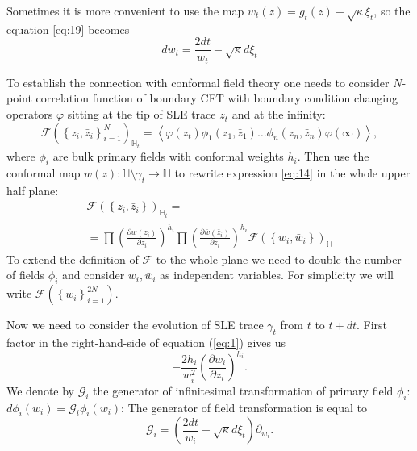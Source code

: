 \documentclass[12pt]{article}
\begin{document}
Sometimes it is more convenient to use the map $w_{t} (z)=g_{t}(z)-\sqrt{\kappa}\xi_{t}$, so the equation \eqref{eq:19} becomes
\begin{equation}
  \label{eq:20}
       d w _{t}= \frac{2dt}{w_{t} }-\sqrt{\kappa}d\xi_{t}  
\end{equation}

To establish the connection with conformal field theory one needs to
consider $N$-point correlation function of boundary CFT with boundary
condition changing operators $\varphi$ sitting at the tip of SLE trace
$z_t$ and at the infinity:
\begin{equation}
  \mathcal{F}(\left\{z_{i},\bar z_{i}\right\}_{i=1}^{N})_{\mathbb{H}_{t}}=
\left<\varphi(z_{t}) \phi_{1}(z_{1},\bar z_{1}) \dots \phi_{n}(z_{n},\bar z_{n})
      \varphi(\infty)\right>,
    \label{eq:14}
\end{equation}
where $\phi_{i}$ are bulk primary fields with conformal weights $h_i$.
Then use the conformal map  $w(z):\mathbb{H}\setminus\gamma_{t}\to \mathbb{H}$ to rewrite expression \eqref{eq:14} in the whole upper half plane:
\begin{multline}
  \mathcal{F}(\left\{z_{i},\bar z_{i}\right\})_{\mathbb{H}_{t}}=\\
  =\prod \left(\frac{\partial w(z_{i})}{\partial z_{i}}\right)^{h_{i}} 
  \prod \left(\frac{\partial \bar w(\bar z_{i})}{\partial \bar z_{i}}\right)^{\bar h_i}
  \mathcal{F}(\left\{w_{i}, \bar w_{i}\right\})_{\mathbb{H}}
  \label{eq:4}
\end{multline}
To extend the definition of $\mathcal{F}$ to the whole plane we need
to double the number of fields $\phi_{i}$
\cite{cardy2004boundary,cardy1984conformal} and consider $w_{i},\bar
w_{i}$ as independent variables. For simplicity we will write
$\mathcal{F}(\left\{w_{i}\right\}_{i=1}^{2N})$.

Now we need to consider the evolution of SLE trace $\gamma_{t}$ from  $t$ to $t+ dt$. First factor in the right-hand-side of equation (\ref{eq:1}) gives us
\begin{equation*}
  -\frac{2h_{i}}{w_{i}^{2}}\left(\frac{\partial w_{i}}{\partial z_{i}}\right)^{h_{i}}.
\end{equation*}
We denote by $\mathcal{G}_{i}$ the generator of infinitesimal
transformation of primary field $\phi_{i}$:$d\phi_{i}(w_{i}) =
\mathcal{G}_{i}\phi_{i}(w_{i})$:
 The generator of field transformation is equal to
\begin{equation}
  \mathcal{G}_{i}=\left(\frac{2dt}{w_{i}}-\sqrt{\kappa} d\xi_{t}\right) \partial_{w_{i}}.
  \label{eq:11}
\end{equation}
\end{document}
